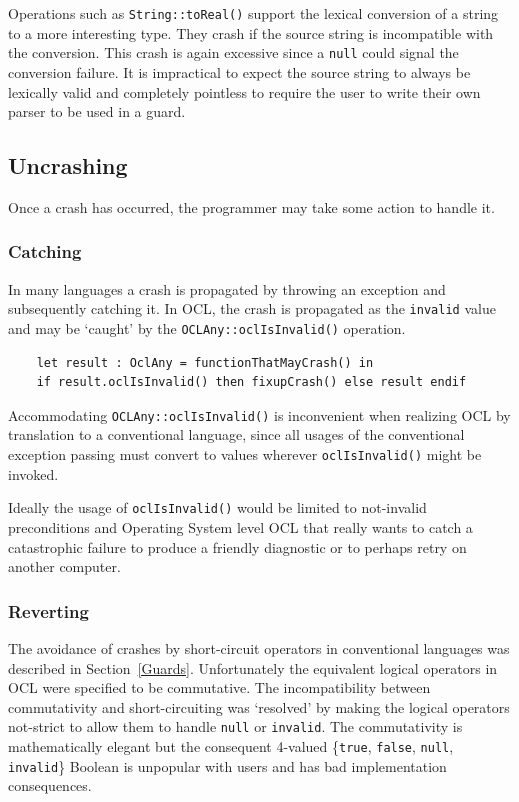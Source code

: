 \documentclass[
]{ceurart}
\begin{document}
Operations such as \verb|String::toReal()| support the lexical conversion of a string to a more interesting type. They crash if the source string is incompatible with the conversion. This crash is again excessive since a \verb|null| could signal the conversion failure. It is impractical to expect the source string to always be lexically valid and completely pointless to require the user to write their own parser to be used in a guard.

\subsection{Uncrashing}

Once a crash has occurred, the programmer may take some action to handle it.

\subsubsection{Catching}

In many languages a crash is propagated by throwing an exception and subsequently catching it. In OCL, the crash is propagated as the \verb|invalid| value and may be `caught' by the \verb|OCLAny::oclIsInvalid()| operation.

\begin{verbatim}
    let result : OclAny = functionThatMayCrash() in
    if result.oclIsInvalid() then fixupCrash() else result endif
\end{verbatim}

Accommodating \verb|OCLAny::oclIsInvalid()| is inconvenient when realizing OCL by translation to a conventional language, since all usages of the conventional exception passing must convert to values wherever \verb|oclIsInvalid()| might be invoked.

Ideally the usage of \verb|oclIsInvalid()| would be limited to not-invalid preconditions and Operating System level OCL that really wants to catch a catastrophic failure to produce a friendly diagnostic or to perhaps retry on another computer.

\subsubsection{Reverting}

The avoidance of crashes by short-circuit operators in conventional languages was described in Section~\ref{Guards}. Unfortunately the equivalent logical operators in OCL were  specified to be commutative. The incompatibility between commutativity and short-circuiting was `resolved' by making the logical operators not-strict to allow them to handle \verb|null| or \verb|invalid|. The commutativity is mathematically elegant but the consequent 4-valued \{\verb|true|, \verb|false|, \verb|null|, \verb|invalid|\} Boolean is unpopular with users and has bad implementation consequences.
\end{document}
